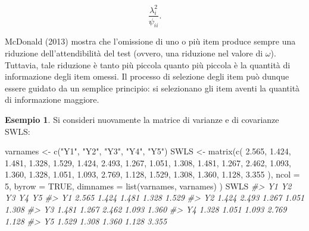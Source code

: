 \documentclass[
  11pt,
]{krantz}
\makeatletter
\newenvironment{Shaded}{\begin{snugshade}}{\end{snugshade}}
\newcommand{\AttributeTok}[1]{\textcolor[rgb]{0.61,0.61,0.61}{#1}}
\newcommand{\CommentTok}[1]{\textcolor[rgb]{0.37,0.37,0.37}{\textit{#1}}}
\newcommand{\ConstantTok}[1]{\textcolor[rgb]{0,0,0}{#1}}
\newcommand{\DecValTok}[1]{\textcolor[rgb]{0.06,0.06,0.06}{#1}}
\newcommand{\FloatTok}[1]{\textcolor[rgb]{0.06,0.06,0.06}{#1}}
\newcommand{\FunctionTok}[1]{\textcolor[rgb]{0,0,0}{#1}}
\newcommand{\NormalTok}[1]{#1}
\newcommand{\OtherTok}[1]{\textcolor[rgb]{0.37,0.37,0.37}{#1}}
\newcommand{\StringTok}[1]{\textcolor[rgb]{0.5,0.5,0.5}{#1}}
\newenvironment{kframe}{%
\medskip{}
\setlength{\fboxsep}{.8em}
 \def\at@end@of@kframe{}%
 \ifinner\ifhmode%
  \def\at@end@of@kframe{\end{minipage}}%
  \begin{minipage}{\columnwidth}%
 \fi\fi%
 \def\FrameCommand##1{\hskip\@totalleftmargin \hskip-\fboxsep
 \colorbox{shadecolor}{##1}\hskip-\fboxsep
     \hskip-\linewidth \hskip-\@totalleftmargin \hskip\columnwidth}%
 \MakeFramed {\advance\hsize-\width
   \@totalleftmargin\z@ \linewidth\hsize
   \@setminipage}}%
 {\par\unskip\endMakeFramed%
 \at@end@of@kframe}
\renewenvironment{Shaded}{\begin{kframe}}{\end{kframe}}
\theoremstyle{definition}
\theoremstyle{definition}
\newtheorem{example}{Esempio}[chapter]
\theoremstyle{definition}
\theoremstyle{definition}
\theoremstyle{remark}
\makeatother
\begin{document}
\[
\frac{\lambda_i^2}{\psi_{ii}}.
\]

McDonald (2013) mostra che l'omissione di uno o più item produce sempre una riduzione dell'attendibilità del test (ovvero, una riduzione nel valore di \(\omega\)). Tuttavia, tale riduzione è tanto più piccola quanto più piccola è la quantità di informazione degli item omessi. Il processo di selezione degli item può dunque essere guidato da un semplice principio: si selezionano gli item aventi la quantità di informazione maggiore.

\begin{example}
Si consideri nuovamente la matrice di varianze e di covarianze SWLS:

\begin{Shaded}
\begin{Highlighting}[]
\NormalTok{varnames }\OtherTok{\textless{}{-}} \FunctionTok{c}\NormalTok{(}\StringTok{"Y1"}\NormalTok{, }\StringTok{"Y2"}\NormalTok{, }\StringTok{"Y3"}\NormalTok{, }\StringTok{"Y4"}\NormalTok{, }\StringTok{"Y5"}\NormalTok{)}
\NormalTok{SWLS }\OtherTok{\textless{}{-}} \FunctionTok{matrix}\NormalTok{(}\FunctionTok{c}\NormalTok{(}
  \FloatTok{2.565}\NormalTok{, }\FloatTok{1.424}\NormalTok{, }\FloatTok{1.481}\NormalTok{, }\FloatTok{1.328}\NormalTok{, }\FloatTok{1.529}\NormalTok{,}
  \FloatTok{1.424}\NormalTok{, }\FloatTok{2.493}\NormalTok{, }\FloatTok{1.267}\NormalTok{, }\FloatTok{1.051}\NormalTok{, }\FloatTok{1.308}\NormalTok{,}
  \FloatTok{1.481}\NormalTok{, }\FloatTok{1.267}\NormalTok{, }\FloatTok{2.462}\NormalTok{, }\FloatTok{1.093}\NormalTok{, }\FloatTok{1.360}\NormalTok{,}
  \FloatTok{1.328}\NormalTok{, }\FloatTok{1.051}\NormalTok{, }\FloatTok{1.093}\NormalTok{, }\FloatTok{2.769}\NormalTok{, }\FloatTok{1.128}\NormalTok{,}
  \FloatTok{1.529}\NormalTok{, }\FloatTok{1.308}\NormalTok{, }\FloatTok{1.360}\NormalTok{, }\FloatTok{1.128}\NormalTok{, }\FloatTok{3.355}
\NormalTok{),}
\AttributeTok{ncol =} \DecValTok{5}\NormalTok{, }\AttributeTok{byrow =} \ConstantTok{TRUE}\NormalTok{,}
\AttributeTok{dimnames =} \FunctionTok{list}\NormalTok{(varnames, varnames)}
\NormalTok{)}
\NormalTok{SWLS}
\CommentTok{\#\textgreater{}       Y1    Y2    Y3    Y4    Y5}
\CommentTok{\#\textgreater{} Y1 2.565 1.424 1.481 1.328 1.529}
\CommentTok{\#\textgreater{} Y2 1.424 2.493 1.267 1.051 1.308}
\CommentTok{\#\textgreater{} Y3 1.481 1.267 2.462 1.093 1.360}
\CommentTok{\#\textgreater{} Y4 1.328 1.051 1.093 2.769 1.128}
\CommentTok{\#\textgreater{} Y5 1.529 1.308 1.360 1.128 3.355}
\end{Highlighting}
\end{Shaded}


\end{example}
\end{document}

